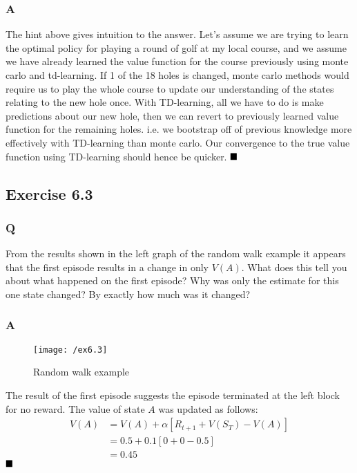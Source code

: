 \subsubsection{A}
The hint above gives intuition to the answer. Let's assume we are trying to learn the optimal policy for playing a round of golf at my local course, and we assume we have already learned the value function for the course previously using monte carlo and td-learning. If 1 of the 18 holes is changed, monte carlo methods would require us to play the whole course to update our understanding of the states relating to the new hole once. With TD-learning, all we have to do is make predictions about our new hole, then we can revert to previously learned value function for the remaining holes. i.e. we bootstrap off of previous knowledge more effectively with TD-learning than monte carlo. Our convergence to the true value function using TD-learning should hence be quicker.
$
\hfill \blacksquare
$

\subsection{Exercise 6.3}
\subsubsection{Q}
From the results shown in the left graph of the random walk example it appears that the first episode results in a change in only $V(A)$. What does this tell you about what happened on the first episode? Why was only the estimate for this one state changed? By exactly how much was it changed?
\subsubsection{A}
\begin{figure}[h!]
	\centering
	\texttt{[image: /ex6.3]}
	\caption{Random walk example}
	\label{fig:ex6.3}
\end{figure}

The result of the first episode suggests the episode terminated at the left block for no reward. The value of state $A$ was updated as follows:
\begin{align}
V(A) &= V(A) + \alpha \left[R_{t+1} + V(S_T) - V(A) \right] \\
&= 0.5 + 0.1 \left[0 + 0 - 0.5\right] \\
&= 0.45
\end{align}
$
\hfill \blacksquare
$

